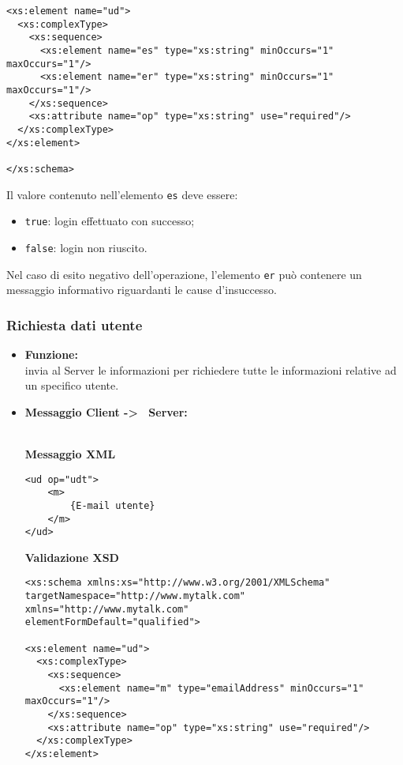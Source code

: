 {{\begin{itemize}
{\begin{lstlisting}
<xs:element name="ud">
  <xs:complexType>
    <xs:sequence>
      <xs:element name="es" type="xs:string" minOccurs="1" maxOccurs="1"/>
      <xs:element name="er" type="xs:string" minOccurs="1" maxOccurs="1"/>
    </xs:sequence>
    <xs:attribute name="op" type="xs:string" use="required"/>
  </xs:complexType>
</xs:element>

</xs:schema>
				\end{lstlisting}
				Il valore contenuto nell'elemento \texttt{es} deve essere:
				\begin{itemize}
					\item \texttt{true}: login effettuato con successo;
					\item \texttt{false}: login non riuscito.
				\end{itemize}
				Nel caso di esito negativo dell'operazione, l'elemento \texttt{er} può contenere un messaggio informativo riguardanti le cause d'insuccesso.
				}
		\end{itemize}
	}%
	
			\subsubsection{Richiesta dati utente}{
	\label{opUDT}
		\begin{itemize}
			\item[] \textbf{Funzione:}{\\
				invia al Server le informazioni per richiedere tutte le informazioni relative ad un specifico utente.
				}
			
			\item[] \textbf{Messaggio Client -\textgreater~ Server:}{\\
			\textbf{Messaggio XML}\\
				\begin{lstlisting}
<ud op="udt">
	<m>
		{E-mail utente}
	</m>
</ud>
				\end{lstlisting}
				\textbf{Validazione XSD}\\
				\begin{lstlisting}
<xs:schema xmlns:xs="http://www.w3.org/2001/XMLSchema"
targetNamespace="http://www.mytalk.com"
xmlns="http://www.mytalk.com"
elementFormDefault="qualified">

<xs:element name="ud">
  <xs:complexType>
    <xs:sequence>
      <xs:element name="m" type="emailAddress" minOccurs="1" maxOccurs="1"/>
    </xs:sequence>
    <xs:attribute name="op" type="xs:string" use="required"/>
  </xs:complexType>
</xs:element>


\end{lstlisting}}
\end{itemize}}}
